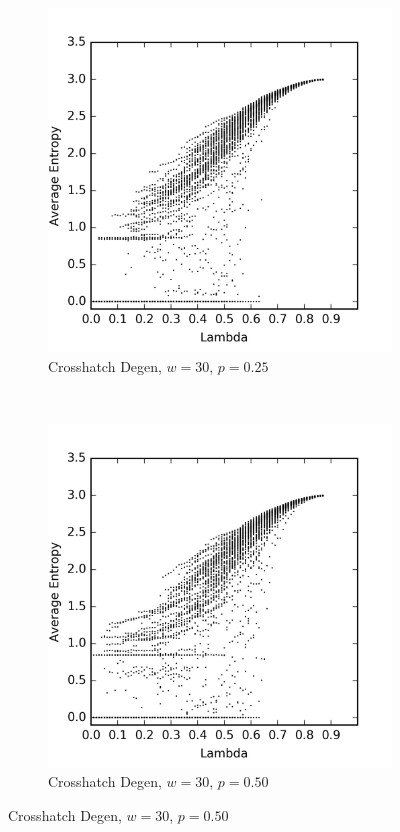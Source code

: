 \documentclass[a4paper,11pt]{article}
\begin{document}
\begin{figure}[htp]
\centering
\begin{subfigure}[t]{0.4\textwidth}
  \includegraphics[width=\textwidth]{ch6_figs/ch_w30_p25_entropy_scatter}
  \caption{Crosshatch Degen, $w=30$, $p=0.25$}

\end{subfigure}
~
\begin{subfigure}[t]{0.4\textwidth}
  \centering
  \includegraphics[width=\textwidth]{ch6_figs/ch_w30_p50_entropy_scatter}
  \caption{Crosshatch Degen, $w=30$, $p=0.50$}


\end{subfigure}
\end{figure}
\end{document}
